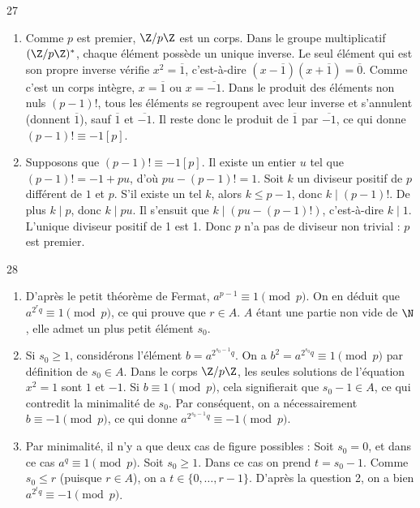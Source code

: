 \begin{correction}{27}
\begin{enumerate}
 \item[a)] Comme $p$ est premier, $\Z/p\Z$ est un corps. 
 Dans le groupe multiplicatif $(\Z/p\Z)^*$, chaque élément possède un unique inverse. 
 Le seul élément qui est son propre inverse vérifie $x^2 = \overline{1}$, c'est-à-dire $(x-\overline{1})(x+\overline{1}) = \overline{0}$. Comme c'est un corps intègre, $x = \overline{1}$ ou $x = \overline{-1}$. 
 Dans le produit des éléments non nuls $(p-1)!$, tous les éléments se regroupent avec leur inverse et s'annulent (donnent $\overline{1}$), sauf $\overline{1}$ et $\overline{-1}$. 
 Il reste donc le produit de $\overline{1}$ par $\overline{-1}$, ce qui donne $(p-1)! \equiv -1 [p]$. 
 
 \item[b)] Supposons que $(p-1)! \equiv -1 [p]$. Il existe un entier $u$ tel que $(p-1)! = -1 + pu$, d'où $pu - (p-1)! = 1$. 
 Soit $k$ un diviseur positif de $p$ différent de $1$ et $p$. S'il existe un tel $k$, alors $k \le p-1$, donc $k \mid (p-1)!$. 
 De plus $k \mid p$, donc $k \mid pu$. Il s'ensuit que $k \mid (pu - (p-1)!)$, c'est-à-dire $k \mid 1$. 
 L'unique diviseur positif de 1 est 1. Donc $p$ n'a pas de diviseur non trivial : $p$ est premier. 
\end{enumerate}
\end{correction}

\begin{correction}{28}
\begin{enumerate}
 \item D'après le petit théorème de Fermat, $a^{p-1} \equiv 1 \pmod{p}$. 
 On en déduit que $a^{2^r q} \equiv 1 \pmod{p}$, ce qui prouve que $r \in A$. 
 $A$ étant une partie non vide de $\N$, elle admet un plus petit élément $s_0$. 
 
 \item Si $s_0 \ge 1$, considérons l'élément $b = a^{2^{s_0-1} q}$. 
 On a $b^2 = a^{2^{s_0} q} \equiv 1 \pmod{p}$ par définition de $s_0 \in A$. 
 Dans le corps $\Z/p\Z$, les seules solutions de l'équation $x^2 = 1$ sont $1$ et $-1$. 
 Si $b \equiv 1 \pmod{p}$, cela signifierait que $s_0-1 \in A$, ce qui contredit la minimalité de $s_0$. 
 Par conséquent, on a nécessairement $b \equiv -1 \pmod{p}$, ce qui donne $a^{2^{s_0-1} q} \equiv -1 \pmod{p}$. 
 
 \item Par minimalité, il n'y a que deux cas de figure possibles :
 Soit $s_0 = 0$, et dans ce cas $a^q \equiv 1 \pmod{p}$. 
 Soit $s_0 \ge 1$. Dans ce cas on prend $t = s_0 - 1$. Comme $s_0 \le r$ (puisque $r \in A$), on a $t \in \{0, \dots, r-1\}$. 
 D'après la question 2, on a bien $a^{2^t q} \equiv -1 \pmod{p}$. 
\end{enumerate}
\end{correction}

